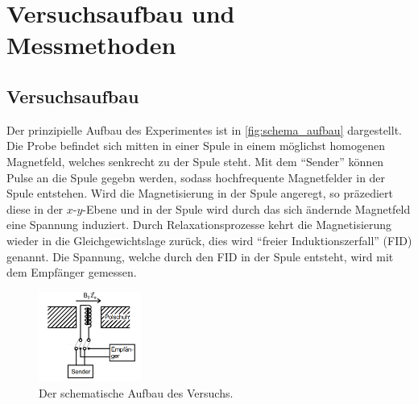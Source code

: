 \section{Versuchsaufbau und Messmethoden} 

    \subsection{Versuchsaufbau}
    \label{sec:Aufbau}

        \noindent Der prinzipielle Aufbau des Experimentes ist in \autoref{fig:schema_aufbau} dargestellt. Die Probe befindet sich mitten in einer Spule in einem möglichst homogenen Magnetfeld, welches senkrecht zu der Spule steht.
        Mit dem \enquote{Sender} können Pulse an die Spule gegebn werden, sodass hochfrequente Magnetfelder in der Spule entstehen. Wird die Magnetisierung in der Spule angeregt, so präzediert diese in der 
        $x$-$y$-Ebene und in der Spule wird durch das sich ändernde Magnetfeld eine Spannung induziert. Durch Relaxationsprozesse kehrt die Magnetisierung wieder in die Gleichgewichtslage zurück, dies wird 
        \enquote{freier Induktionszerfall} (FID) genannt. Die Spannung, welche durch den FID in der Spule entsteht, wird mit dem Empfänger gemessen. 

        \begin{figure}[H]
            \centering
            \includegraphics[width=0.3\textwidth]{latex/images/schema_aufbau.png}
            \caption{Der schematische Aufbau des Versuchs. \cite{finke}}
            \label{fig:schema_aufbau}
        \end{figure}

